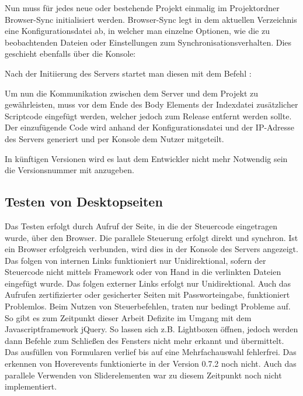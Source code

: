 	Nun muss für jedes neue oder bestehende Projekt einmalig im Projektordner Browser-Sync initialisiert werden. Browser-Sync legt in dem aktuellen Verzeichnis eine Konfigurationsdatei ab, in welcher man einzelne Optionen, wie die zu beobachtenden Dateien oder Einstellungen zum Synchronisationsverhalten. Dies geschieht ebenfalls über die Konsole:
	
	Nach der Initiierung des Servers startet man diesen mit dem Befehl :
	
	Um nun die Kommunikation zwischen dem Server und dem Projekt zu gewährleisten, muss vor dem Ende des Body Elements der Indexdatei zusätzlicher Scriptcode eingefügt werden, welcher jedoch zum Release entfernt werden sollte. Der einzufügende Code  wird anhand der Konfigurationsdatei und der IP-Adresse des Servers generiert und per Konsole dem Nutzer mitgeteilt.
	
	In künftigen Versionen wird es laut dem Entwickler nicht mehr Notwendig sein die Versionsnummer mit anzugeben.
	
	\subsection{Testen von Desktopseiten}
	Das Testen erfolgt durch Aufruf der Seite, in die der Steuercode eingetragen wurde, über den Browser. Die parallele Steuerung erfolgt direkt und synchron. Ist ein Browser erfolgreich verbunden, wird dies in der Konsole des Servers angezeigt.
	Das folgen von internen Links funktioniert nur Unidirektional, sofern der Steuercode nicht mittels Framework oder von Hand in die verlinkten Dateien eingefügt wurde. Das folgen externer Links erfolgt nur Unidirektional. Auch das Aufrufen zertifizierter oder gesicherter Seiten mit Passworteingabe, funktioniert Problemlos. Beim Nutzen von Steuerbefehlen, traten nur bedingt Probleme auf. So gibt es zum Zeitpunkt dieser Arbeit Defizite im Umgang mit dem Javascriptframework jQuery. So lassen sich z.B. Lightboxen öffnen, jedoch werden dann Befehle zum \mbox{Schließen} des Fensters nicht mehr erkannt und übermittelt. Das ausfüllen von Formularen verlief bis auf eine Mehrfachauswahl fehlerfrei. Das erkennen von Hoverevents funktionierte in der Version 0.7.2 noch nicht. Auch das parallele Verwenden von Sliderelementen war zu diesem Zeitpunkt noch nicht implementiert.
	
